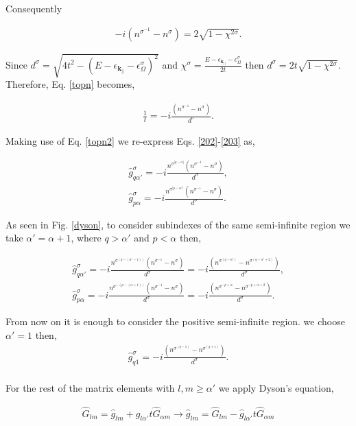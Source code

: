 \documentclass[10pt,prb,showpacs,amssymb,floatfix]{revtex4-1}
\newcommand{\para}{\parallel}
\newcommand{\alp}{\alpha}
\newcommand{\eps}{\epsilon}
\newcommand{\Og}{\Omega}
\newcommand{\sg}{\sigma}
\newcommand{\h}{\hat}
\begin{document}
Consequently 

\begin{align}
-i(n^{\sg^{-1}} - n^{\sg}) = 2\sqrt{1 -\chi^{2 \sg } }.
\label{topn}
\end{align}

Since $d^{\sg} = \sqrt{ 4t^2 - (E-\eps_{\bm k_\para} - \eps_\Og^{\sg})^2 } $ and $\chi^{\sg} = \frac{E-\eps_{\bm{k}_{||}}- \eps_\Og^{\sg}}{2t}$ then $d^{\sg}  = 2t \sqrt{1-\chi^{2 \sg }}$. Therefore, Eq. \eqref{topn} becomes,

\begin{align}
\frac{1}{t} = -i\frac{(n^{\sg^{-1}} - n^{\sg})}{d^\sg}.
\label{topn2}
\end{align}

Making use of Eq. \eqref{topn2} we re-express Eqs. \eqref{202}-\eqref{203} as,

\begin{align}
\label{2022}
\h g^\sg_{q\alp'} =  -i\frac{n^{\sg^{|q-\alp|}}(n^{\sg^{-1}} - n^{\sg})}{d^\sg} , \\
\h g^\sg_{p\alp}  =  -i\frac{n^{\sg^{|p-\alp'|}}(n^{\sg^{-1}} - n^{\sg})}{d^\sg}.
\label{2033}
\end{align}

As seen in Fig. \ref{dyson}, to consider subindexes of the same semi-infinite region we take $\alp' = \alp + 1$, where $q>\alp'$ and $p<\alp$ then,

\begin{align}
\label{20222}
\h g^\sg_{q\alp'} =  -i\frac{n^{\sg^{(q-(\alp'-1))}}(n^{\sg^{-1}} - n^{\sg})}{d^\sg} = -i\frac{(n^{\sg^{(q-\alp')}} - n^{\sg^{(q-\alp'+2)}})}{d^\sg} , \\
\h g^\sg_{p\alp}  =  -i\frac{n^{\sg^{-(p-(\alp+1))}}(n^{\sg^{-1}} - n^{\sg})}{d^\sg} =  -i\frac{(n^{\sg^{-p+\alp}} - n^{\sg^{-p+\alp+2}})}{d^\sg} .
\label{20333}
\end{align}

From now on it is enough to consider the positive semi-infinite region. we choose $\alp'=1$ then,
\begin{align}
\label{202222}
\h g^\sg_{q1} =   -i\frac{(n^{\sg^{(q-1)}} - n^{\sg^{(q+1)}})}{d^\sg}. \\
\end{align}

For the rest of the matrix elements with $l,m \geq \alp'$ we apply Dyson's equation,

\begin{align}
\h G_{lm} = \h g_{lm} + \h g_{l\alp'}t\h G_{\alp m} \rightarrow \h g_{lm} = \h G_{lm} -  \h g_{l\alp'}t\h G_{\alp m}
\end{align}
\end{document}
